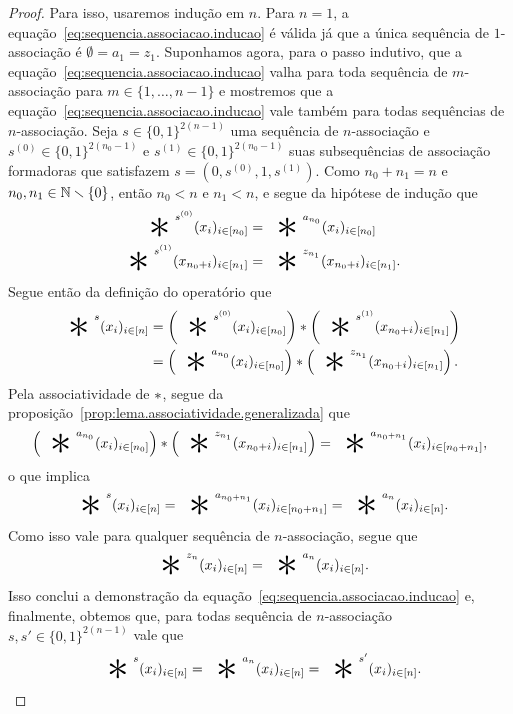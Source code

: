 \begin{proof}
Para isso, usaremos indução em $n$. Para $n=1$, a equação~\ref{eq:sequencia.associacao.inducao} é válida já que a única sequência de $1$-associação é $\emptyset = a_1 = z_1$. Suponhamos agora, para o passo indutivo, que a equação~\ref{eq:sequencia.associacao.inducao} valha para toda sequência de $m$-associação para $m \in \{1, \ldots, n-1\}$ e mostremos que a equação~\ref{eq:sequencia.associacao.inducao} vale também para todas sequências de $n$-associação. Seja $s \in \{0,1\}^{2(n-1)}$ uma sequência de $n$-associação e $s^{(0)} \in \{0,1\}^{2(n_0-1)}$ e $s^{(1)} \in \{0,1\}^{2(n_0-1)}$ suas subsequências de associação formadoras que satisfazem $s=(0,s^{(0)},1,s^{(1)})$. Como $n_0+n_1=n$ e $n_0, n_1 \in \mathbb{N} \smallsetminus \{0\}$, então $n_0 < n$ e $n_1 < n$, e segue da hipótese de indução que
	 \begin{align*}
	\bigopb\nolimits^{s^{(0)}} (x_i)_{i \in [n_0]} &= \bigopb\nolimits^{a_{n_0}} (x_i)_{i \in [n_0]} \\
	\bigopb\nolimits^{s^{(1)}} (x_{n_0+i})_{i \in [n_1]} &= \bigopb\nolimits^{z_{n_1}} (x_{n_0+i})_{i \in [n_1]}.
	 \end{align*}
Segue então da definição do operatório que
	\begin{align*}
	\bigopb\nolimits^{s} (x_i)_{i \in [n]} &= \left( \bigopb\nolimits^{s^{(0)}} (x_i)_{i \in [n_0]} \right) \opb \left( \bigopb\nolimits^{s^{(1)}} (x_{n_0+i})_{i \in [n_1]} \right) \\
		&= \left( \bigopb\nolimits^{a_{n_0}} (x_i)_{i \in [n_0]} \right) \opb \left( \bigopb\nolimits^{z_{n_1}} (x_{n_0+i})_{i \in [n_1]} \right).
	\end{align*}
Pela associatividade de $\ast$, segue da proposição~\ref{prop:lema.associatividade.generalizada} que
	\begin{equation*}
	\left( \bigopb\nolimits^{a_{n_0}} (x_i)_{i \in [n_0]} \right) \opb \left( \bigopb\nolimits^{z_{n_1}} (x_{n_0+i})_{i \in [n_1]} \right) = \bigopb\nolimits^{a_{n_0+n_1}} (x_i)_{i \in [n_0+n_1]},
	\end{equation*}
o que implica
	\begin{equation*}
	\bigopb\nolimits^{s} (x_i)_{i \in [n]} = \bigopb\nolimits^{a_{n_0+n_1}} (x_i)_{i \in [n_0+n_1]} = \bigopb\nolimits^{a_n} (x_i)_{i \in [n]}.
	\end{equation*}
Como isso vale para qualquer sequência de $n$-associação, segue que
	\begin{equation*}
	\bigopb\nolimits^{z_n} (x_i)_{i \in [n]} = \bigopb\nolimits^{a_n} (x_i)_{i \in [n]}.
	\end{equation*}
Isso conclui a demonstração da equação~\ref{eq:sequencia.associacao.inducao} e, finalmente, obtemos que, para todas sequência de $n$-associação $s,s' \in \{0,1\}^{2(n-1)}$ vale que
	\begin{equation*}
	\bigopb\nolimits^{s} (x_i)_{i \in [n]} = \bigopb\nolimits^{a_n} (x_i)_{i \in [n]} = \bigopb\nolimits^{s'} (x_i)_{i \in [n]}. \qedhere
	\end{equation*}
\end{proof}

